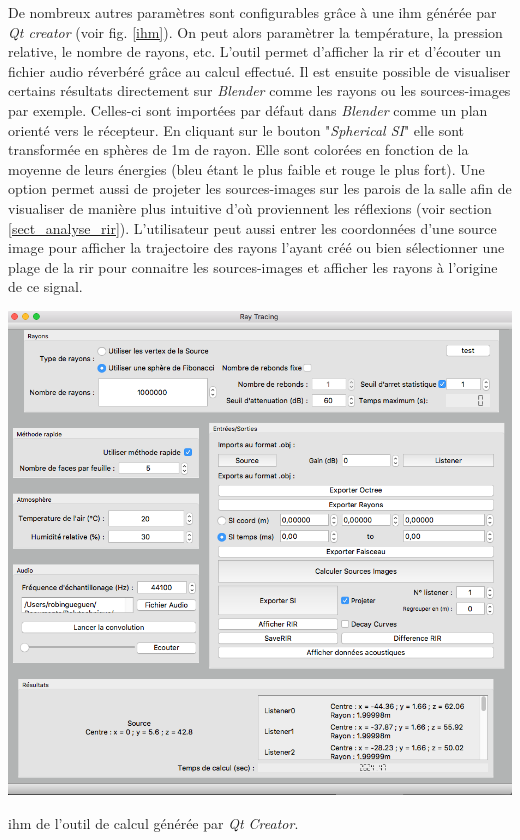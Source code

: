De nombreux autres paramètres sont configurables grâce à une \gls{ihm} générée par \textit{Qt creator} (voir fig. \ref{ihm}). On peut alors paramètrer la température, la pression relative, le nombre de rayons, etc. L'outil permet d'afficher la \gls{rir} et d'écouter un fichier audio réverbéré grâce au calcul effectué. Il est ensuite possible de visualiser certains résultats directement sur \textit{Blender} comme les rayons ou les sources-images par exemple. Celles-ci sont importées par défaut dans \textit{Blender} comme un plan orienté vers le récepteur. En cliquant sur le bouton "\textit{Spherical SI}" elle sont transformée en sphères de 1m de rayon. Elle sont colorées en fonction de la moyenne de leurs énergies (bleu étant le plus faible et rouge le plus fort). Une option permet aussi de projeter les sources-images sur les parois de la salle afin de visualiser de manière plus intuitive d'où proviennent les réflexions (voir section \ref{sect_analyse_rir}). L'utilisateur peut aussi entrer les coordonnées d'une source image pour afficher la trajectoire des rayons l'ayant créé ou bien sélectionner une plage de la \gls{rir} pour connaitre les sources-images et afficher les rayons à l'origine de ce signal.
\begin{figureth}
	\includegraphics[width=\linewidth]{images/ihm}
	\caption{\gls{ihm} de l'outil de calcul générée par \textit{Qt Creator}.}
	\label{ihm}
\end{figureth}
%
%

